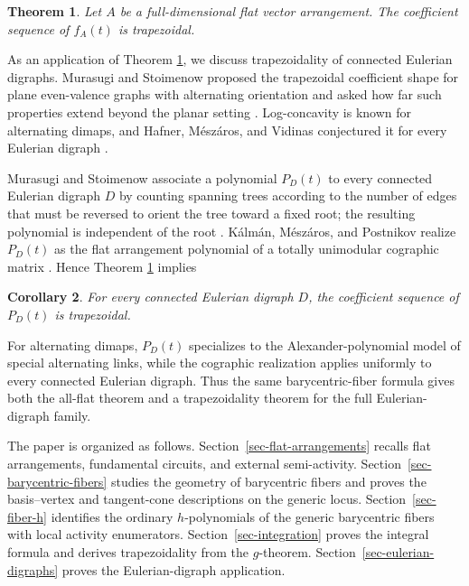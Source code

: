 \documentclass[12pt]{amsart}
\newtheorem{theorem}{Theorem}
\newtheorem{corollary}[theorem]{Corollary}
\numberwithin{equation}{section}
\numberwithin{theorem}{section}
\begin{document}
\begin{theorem}
  \label{thm-main-intro}
  Let $A$ be a full-dimensional flat vector arrangement. The coefficient sequence of $f_A(t)$ is trapezoidal.
\end{theorem}

As an application of Theorem \ref{thm-main-intro}, we discuss trapezoidality of connected Eulerian digraphs.
Murasugi and Stoimenow proposed the trapezoidal coefficient shape for plane even-valence graphs with alternating orientation and asked how far such properties extend beyond the planar setting \cite[Sections~7.1 and~7.4]{MS03}. Log-concavity is known for alternating dimaps, and Hafner, Mészáros, and Vidinas conjectured it for every Eulerian digraph \cite[Theorem~1.5 and Conjecture~1.6]{HMVGeneralized}. 

Murasugi and Stoimenow associate a polynomial $P_D(t)$ to every connected Eulerian digraph $D$ by counting spanning trees according to the number of edges that must be reversed to orient the tree toward a fixed root; the resulting polynomial is independent of the root \cite[Proposition~1]{MS03}. Kálmán, Mészáros, and Postnikov realize $P_D(t)$ as the flat arrangement polynomial of a totally unimodular cographic matrix \cite[Sections~4.2 and~5.1]{KMP}. Hence Theorem \ref{thm-main-intro} implies

\begin{corollary}
  \label{cor-euleriandiagraph-trapezoidal}
  For every connected Eulerian digraph $D$, the coefficient sequence of $P_D(t)$ is trapezoidal.
\end{corollary}

For alternating dimaps, $P_D(t)$ specializes to the Alexander-polynomial model of special alternating links, while the cographic realization applies uniformly to every connected Eulerian digraph. Thus the same barycentric-fiber formula gives both the all-flat theorem and a trapezoidality theorem for the full Eulerian-digraph family.

The paper is organized as follows.
Section~\ref{sec-flat-arrangements} recalls flat arrangements, fundamental circuits, and external semi-activity.
Section~\ref{sec-barycentric-fibers} studies the geometry of barycentric fibers and proves the basis--vertex and tangent-cone descriptions on the generic locus.
Section~\ref{sec-fiber-h} identifies the ordinary $h$-polynomials
of the generic barycentric fibers with local activity enumerators.
Section~\ref{sec-integration} proves the integral formula and derives trapezoidality from the $g$-theorem.
Section~\ref{sec-eulerian-digraphs} proves the Eulerian-digraph application.
\end{document}
